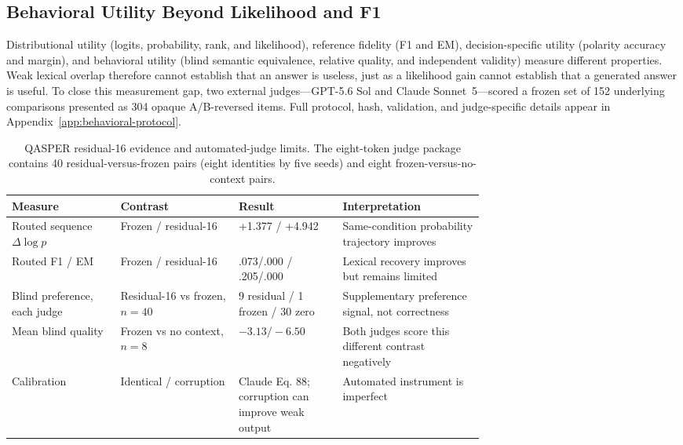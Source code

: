\documentclass[11pt]{article}
\begin{document}
\subsection{Behavioral Utility Beyond Likelihood and F1}
\label{sec:behavioral-judge}

Distributional utility (logits, probability, rank, and likelihood), reference fidelity (F1 and
EM), decision-specific utility (polarity accuracy and margin), and behavioral utility (blind
semantic equivalence, relative quality, and independent validity) measure different properties.
Weak lexical overlap therefore cannot establish that an answer is useless, just as a likelihood
gain cannot establish that a generated answer is useful. To close this measurement gap, two
external judges---GPT-5.6 Sol and Claude Sonnet~5---scored a frozen set of 152 underlying
comparisons presented as 304 opaque A/B-reversed items. Full protocol, hash, validation, and
judge-specific details appear in Appendix~\ref{app:behavioral-protocol}.

\begin{table}[H]
\centering
\small
\caption{QASPER residual-16 evidence and automated-judge limits. The eight-token judge package
contains 40 residual-versus-frozen pairs (eight identities by five seeds) and eight
frozen-versus-no-context pairs.}
\label{tab:qasper-convergence}
\begin{tabularx}{\linewidth}{L{0.23\linewidth}L{0.25\linewidth}L{0.22\linewidth}Y}
\toprule
Measure & Contrast & Result & Interpretation \\
\midrule
Routed sequence $\Delta\log p$ & Frozen / residual-16 & +1.377 / +4.942 & Same-condition probability trajectory improves \\
Routed F1 / EM & Frozen / residual-16 & .073/.000 / .205/.000 & Lexical recovery improves but remains limited \\
Blind preference, each judge & Residual-16 vs frozen, $n=40$ & 9 residual / 1 frozen / 30 zero & Supplementary preference signal, not correctness \\
Mean blind quality & Frozen vs no context, $n=8$ & $-3.13/-6.50$ & Both judges score this different contrast negatively \\
Calibration & Identical / corruption & Claude Eq. 88; corruption can improve weak output & Automated instrument is imperfect \\
\bottomrule
\end{tabularx}
\end{table}
\end{document}

